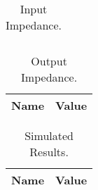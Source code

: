 \begin{table}[h]
  \centering
  \begin{tabular}{|l|r|}
    \hline    
   
   \end{tabular}
  \caption{Input Impedance.}
    \label{tab:zin}
\end{table}

\begin{table}[h]
  \centering
  \begin{tabular}{|l|r|}
    \hline    
    {\bf Name} & {\bf Value}\\ \hline
    
  \end{tabular}
  \caption{Output Impedance.}
  \label{tab:zout}
\end{table}


\begin{table}[h]
  \centering
  \begin{tabular}{|l|r|}
    \hline    
    {\bf Name} & {\bf Value}\\ \hline
    
  \end{tabular}
  \caption{Simulated Results.}
  \label{tab:finalr}
\end{table}

\newpage

